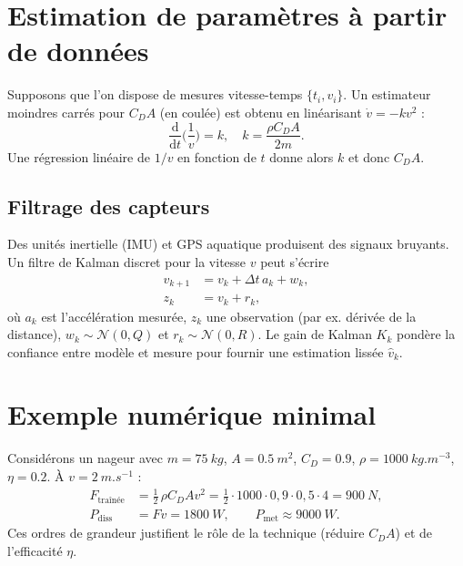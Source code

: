 \documentclass[12pt,a4paper]{article}
\newcommand{\dd}{\mathrm{d}}
\begin{document}
\section{Estimation de paramètres à partir de données}
Supposons que l'on dispose de mesures vitesse-temps $\{t_i,v_i\}$. Un estimateur moindres carrés pour $C_D A$ (en coulée) est obtenu en linéarisant $\dot v = -k v^2$ :
\begin{equation}
 \frac{\dd}{\dd t}\Big(\frac{1}{v}\Big) = k, \quad k=\frac{\rho C_D A}{2m}.
 \end{equation}
Une régression linéaire de $1/v$ en fonction de $t$ donne alors $k$ et donc $C_D A$.

\subsection{Filtrage des capteurs}
Des unités inertielle (IMU) et GPS aquatique produisent des signaux bruyants. Un filtre de Kalman discret pour la vitesse $v$ peut s'écrire
\begin{align}
 v_{k+1} &= v_k + \Delta t\,a_k + w_k, \\
 z_k &= v_k + r_k,
 \end{align}
où $a_k$ est l'accélération mesurée, $z_k$ une observation (par ex. dérivée de la distance), $w_k\sim\mathcal{N}(0,Q)$ et $r_k\sim\mathcal{N}(0,R)$. Le gain de Kalman $K_k$ pondère la confiance entre modèle et mesure pour fournir une estimation lissée $\hat v_k$.

\section{Exemple numérique minimal}
Considérons un nageur avec $m=\SI{75}{kg}$, $A=\SI{0.5}{m^2}$, $C_D=0.9$, $\rho=\SI{1000}{kg.m^{-3}}$, $\eta=0.2$. À $v=\SI{2}{m.s^{-1}}$ :
\begin{align}
 F_{\mathrm{traînée}} &= \tfrac{1}{2}\,\rho C_D A v^2 = \tfrac{1}{2}\cdot1000\cdot0{,}9\cdot0{,}5\cdot 4 = \SI{900}{N}, \\
 P_{\mathrm{diss}} &= Fv = \SI{1800}{W}, \qquad P_{\mathrm{met}} \approx \SI{9000}{W}.
 \end{align}
Ces ordres de grandeur justifient le rôle de la technique (réduire $C_D A$) et de l'efficacité $\eta$.
\end{document}
